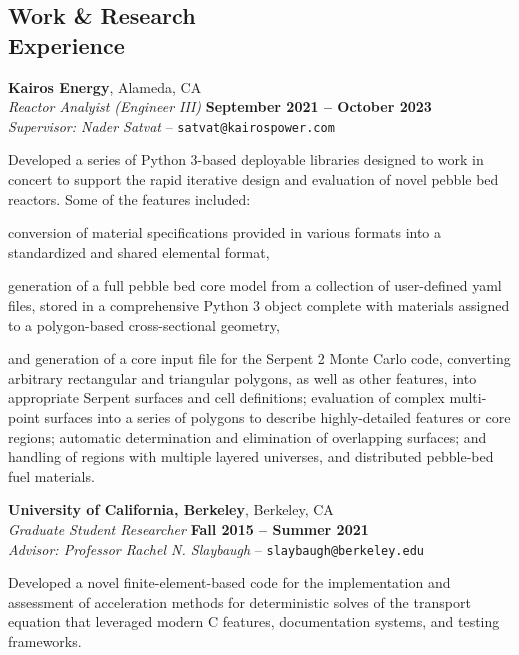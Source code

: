\documentclass[margin,line]{resume}
\newcommand{\Cpp}[1][]{\textrm{C\nolinebreak[4]\hspace{-.05em}\raisebox{.4ex}{\tiny\bfseries++}#1}}
\begin{document}
\begin{resume}
    \section{\mysidestyle Work \& Research \\Experience}
    \textbf{Kairos Energy}, Alameda, CA \\
                \textsl{Reactor Analyist (Engineer III)} \hfill
                \textbf{September 2021 -- October 2023} \\
                \textsl{Supervisor: Nader Satvat} -- \verb`satvat@kairospower.com`
                \begin{list2}
                \item[] Developed a series of Python 3-based deployable libraries designed to work in concert to support the rapid iterative design and evaluation of novel pebble bed reactors. Some of the features included:
                \begin{list2}
                \item conversion of material specifications provided in various formats into a standardized and shared elemental format,
                \item generation of a full pebble bed core model from a collection of user-defined yaml files, stored in a comprehensive Python 3 object complete with materials assigned to a polygon-based cross-sectional geometry,
                \item and generation of a core input file for the Serpent 2 Monte Carlo code, converting arbitrary rectangular and triangular polygons, as well as other features, into appropriate Serpent surfaces and cell definitions; evaluation of complex multi-point surfaces into a series of polygons to describe highly-detailed features or core regions; automatic determination and elimination of overlapping surfaces; and handling of regions with multiple layered universes, and distributed pebble-bed fuel materials.
                \end{list2}
                \end{list2}
    \textbf{University of California, Berkeley}, Berkeley, CA\\
                \textsl{Graduate Student Researcher} \hfill
                \textbf{Fall 2015 -- Summer 2021}\\
                \textsl{Advisor: Professor Rachel N. Slaybaugh} -- \verb`slaybaugh@berkeley.edu`
                \begin{list2}
                \item[]                 Developed a novel finite-element-based code for the implementation and
                assessment of acceleration methods for deterministic
                solves of the transport
                equation that leveraged modern \Cpp{} features, documentation systems, and testing frameworks.
                \end{list2}


\end{resume}
\end{document}
